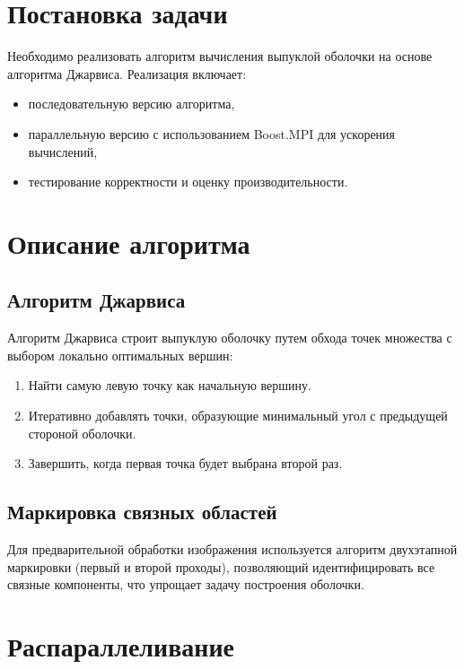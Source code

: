 \documentclass[a4paper,12pt]{article}
\begin{document}
\section{Постановка задачи}

\hspace*{1.25em}Необходимо реализовать алгоритм вычисления выпуклой оболочки на основе алгоритма Джарвиса. Реализация включает:
\begin{itemize}
    \item последовательную версию алгоритма,
    \item параллельную версию с использованием Boost.MPI для ускорения вычислений,
    \item тестирование корректности и оценку производительности.
\end{itemize}

\section{Описание алгоритма}

\subsection{Алгоритм Джарвиса}
\hspace*{1.25em}Алгоритм Джарвиса строит выпуклую оболочку путем обхода точек множества с выбором локально оптимальных вершин:
\begin{enumerate}
    \item Найти самую левую точку как начальную вершину.
    \item Итеративно добавлять точки, образующие минимальный угол с предыдущей стороной оболочки.
    \item Завершить, когда первая точка будет выбрана второй раз.
\end{enumerate}

\subsection{Маркировка связных областей}
\hspace*{1.25em}Для предварительной обработки изображения используется алгоритм двухэтапной маркировки (первый и второй проходы), позволяющий идентифицировать все связные компоненты, что упрощает задачу построения оболочки.

\section{Распараллеливание}
\end{document}
